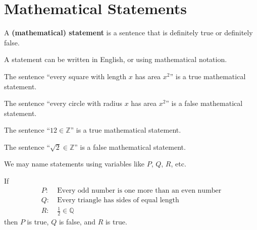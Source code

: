 \section{Mathematical Statements}
\begin{definition}
    A \textbf{(mathematical) statement} is a sentence that is definitely true or definitely false.
\end{definition}
\begin{remark}
    A statement can be written in English, or using mathematical notation.
\end{remark}
\begin{example}
    The sentence ``every square with length $x$ has area $x^2$'' is a true mathematical statement.
\end{example}
\begin{example}
    The sentence ``every circle with radius $x$ has area $x^2$'' is a false mathematical statement.
\end{example}
\begin{example}
    The sentence ``$12 \in \mathbb{Z}$'' is a true mathematical statement.
\end{example}
\begin{example}
    The sentence ``$\sqrt2 \in \mathbb{Z}$'' is a false mathematical statement.
\end{example}

We may name statements using variables like $P$, $Q$, $R$, etc.
\begin{example}
    If
    \begin{align*}
        P: &\ \text{Every odd number is one more than an even number}\\
        Q: &\ \text{Every triangle has sides of equal length}\\
        R: &\ \frac12 \in \mathbb{Q}
    \end{align*}
    then $P$ is true, $Q$ is false, and $R$ is true.
\end{example}

